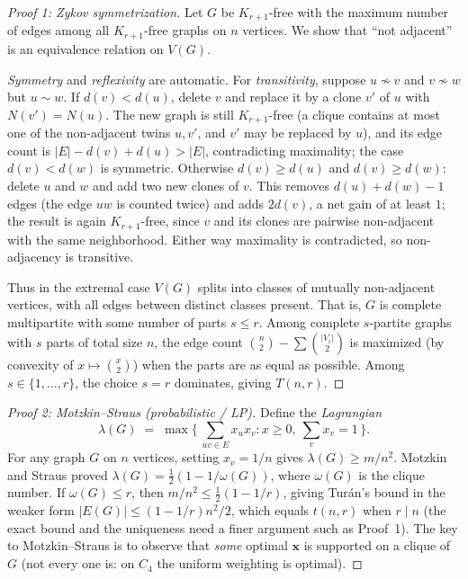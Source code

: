 \documentclass{article}
\theoremstyle{definition}
\begin{document}
\begin{proof}[Proof 1: Zykov symmetrization]
Let $G$ be $K_{r+1}$-free with the maximum number of edges among all
$K_{r+1}$-free graphs on $n$ vertices. We show that ``not adjacent''
is an equivalence relation on $V(G)$.

\emph{Symmetry} and \emph{reflexivity} are automatic. For
\emph{transitivity}, suppose $u \not\sim v$ and $v \not\sim w$ but
$u \sim w$. If $d(v) < d(u)$, delete $v$ and replace it by a clone
$v'$ of $u$ with $N(v') = N(u)$. The new graph is still $K_{r+1}$-free
(a clique contains at most one of the non-adjacent twins $u, v'$, and
$v'$ may be replaced by $u$), and its edge count is
$|E| - d(v) + d(u) > |E|$, contradicting maximality; the case
$d(v) < d(w)$ is symmetric. Otherwise $d(v) \ge d(u)$ and
$d(v) \ge d(w)$: delete $u$ and $w$ and add two new clones of $v$. This
removes $d(u) + d(w) - 1$ edges (the edge $uw$ is counted twice) and
adds $2d(v)$, a net gain of at least $1$; the result is again
$K_{r+1}$-free, since $v$ and its clones are pairwise non-adjacent with
the same neighborhood. Either way maximality is contradicted, so
non-adjacency is transitive.

Thus in the extremal case $V(G)$ splits into classes of mutually
non-adjacent vertices, with all edges between distinct classes
present. That is, $G$ is complete multipartite with some number of
parts $s \le r$. Among complete $s$-partite graphs with
$s$ parts of total size $n$, the edge count
$\binom{n}{2} - \sum \binom{|V_i|}{2}$ is maximized (by convexity of
$x \mapsto \binom{x}{2}$) when the parts are as equal as possible.
Among $s \in \{1, \dots, r\}$, the choice $s = r$ dominates, giving
$T(n, r)$.
\end{proof}

\begin{proof}[Proof 2: Motzkin--Straus (probabilistic / LP)]
Define the \emph{Lagrangian}
\[
  \lambda(G) \;=\; \max\Big\{\, \sum_{uv \in E} x_u x_v : x \ge 0,\ \textstyle\sum_v x_v = 1 \,\Big\}.
\]
For any graph $G$ on $n$ vertices, setting $x_v = 1/n$ gives
$\lambda(G) \ge m/n^2$. Motzkin and Straus proved
$\lambda(G) = \tfrac{1}{2}(1 - 1/\omega(G))$, where $\omega(G)$ is the
clique number. If $\omega(G) \le r$, then
$m/n^2 \le \tfrac{1}{2}(1 - 1/r)$, giving Tur\'an's bound in the weaker
form $|E(G)| \le (1 - 1/r)n^2/2$, which equals $t(n, r)$ when $r \mid n$
(the exact bound and the uniqueness need a finer argument such as
Proof~1). The key to Motzkin--Straus is to observe that \emph{some}
optimal $\mathbf x$ is supported on a clique of $G$ (not every one is:
on $C_4$ the uniform weighting is optimal).
\end{proof}
\end{document}
